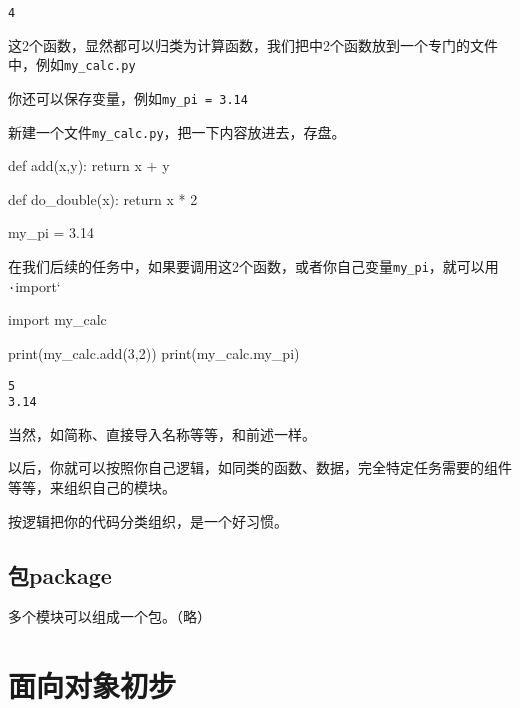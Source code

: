 \documentclass[
  letterpaper,
  DIV=11,
  numbers=noendperiod]{scrreprt}
\newenvironment{Shaded}{\begin{snugshade}}{\end{snugshade}}
\newcommand{\BuiltInTok}[1]{\textcolor[rgb]{0.00,0.23,0.31}{#1}}
\newcommand{\ControlFlowTok}[1]{\textcolor[rgb]{0.00,0.23,0.31}{#1}}
\newcommand{\DecValTok}[1]{\textcolor[rgb]{0.68,0.00,0.00}{#1}}
\newcommand{\FloatTok}[1]{\textcolor[rgb]{0.68,0.00,0.00}{#1}}
\newcommand{\ImportTok}[1]{\textcolor[rgb]{0.00,0.46,0.62}{#1}}
\newcommand{\KeywordTok}[1]{\textcolor[rgb]{0.00,0.23,0.31}{#1}}
\newcommand{\NormalTok}[1]{\textcolor[rgb]{0.00,0.23,0.31}{#1}}
\newcommand{\OperatorTok}[1]{\textcolor[rgb]{0.37,0.37,0.37}{#1}}
\begin{document}
\begin{verbatim}
4
\end{verbatim}

这2个函数，显然都可以归类为计算函数，我们把中2个函数放到一个专门的文件中，例如\texttt{my\_calc.py}

你还可以保存变量，例如\texttt{my\_pi\ =\ 3.14}

新建一个文件\texttt{my\_calc.py}，把一下内容放进去，存盘。

\begin{Shaded}
\begin{Highlighting}[]
\KeywordTok{def}\NormalTok{ add(x,y):}
    \ControlFlowTok{return}\NormalTok{ x }\OperatorTok{+}\NormalTok{ y}

\KeywordTok{def}\NormalTok{ do\_double(x):}
    \ControlFlowTok{return}\NormalTok{ x }\OperatorTok{*} \DecValTok{2}

\NormalTok{my\_pi }\OperatorTok{=} \FloatTok{3.14}
\end{Highlighting}
\end{Shaded}

在我们后续的任务中，如果要调用这2个函数，或者你自己变量\texttt{my\_pi}，就可以用\texttt{·}import`

\begin{Shaded}
\begin{Highlighting}[]
\ImportTok{import}\NormalTok{ my\_calc}

\BuiltInTok{print}\NormalTok{(my\_calc.add(}\DecValTok{3}\NormalTok{,}\DecValTok{2}\NormalTok{))}
\BuiltInTok{print}\NormalTok{(my\_calc.my\_pi)}
\end{Highlighting}
\end{Shaded}

\begin{verbatim}
5
3.14
\end{verbatim}

当然，如简称、直接导入名称等等，和前述一样。

以后，你就可以按照你自己逻辑，如同类的函数、数据，完全特定任务需要的组件等等，来组织自己的模块。

按逻辑把你的代码分类组织，是一个好习惯。

\hypertarget{ux5305package}{%
\section{包package}\label{ux5305package}}

多个模块可以组成一个包。（略）

\hypertarget{ux9762ux5411ux5bf9ux8c61ux521dux6b65}{%
\chapter{面向对象初步}\label{ux9762ux5411ux5bf9ux8c61ux521dux6b65}}
\end{document}
